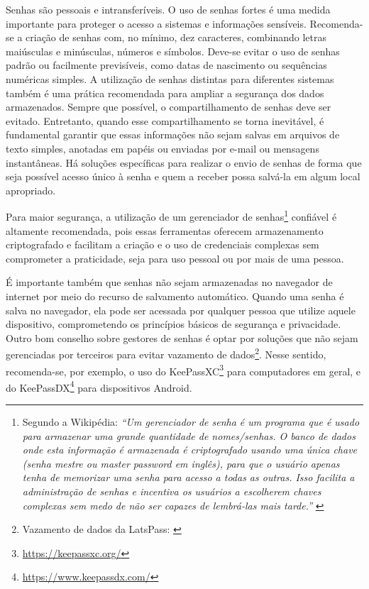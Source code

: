 Senhas são pessoais e intransferíveis. O uso de senhas fortes é uma medida importante para proteger o acesso a sistemas e informações sensíveis. Recomenda-se a criação de senhas com, no mínimo, dez caracteres, combinando letras maiúsculas e minúsculas, números e símbolos. Deve-se evitar o uso de senhas padrão ou facilmente previsíveis, como datas de nascimento ou sequências numéricas simples. A utilização de senhas distintas para diferentes sistemas também é uma prática recomendada para ampliar a segurança dos dados armazenados. Sempre que possível, o compartilhamento de senhas deve ser evitado. Entretanto, quando esse compartilhamento se torna inevitável, é fundamental garantir que essas informações não sejam salvas em arquivos de texto simples, anotadas em papéis ou enviadas por e-mail ou mensagens instantâneas. Há soluções específicas para realizar o envio de senhas de forma que seja possível acesso único à senha e quem a receber possa salvá-la em algum local apropriado.

Para maior segurança, a utilização de um gerenciador de senhas\footnote{Segundo a Wikipédia: \textit{``Um gerenciador de senha é um programa que é usado para armazenar uma grande quantidade de nomes/senhas. O banco de dados onde esta informação é armazenada é criptografado usando uma única chave (senha mestre ou \foreignlanguage{english}{master password} em inglês), para que o usuário apenas tenha de memorizar uma senha para acesso a todas as outras. Isso facilita a administração de senhas e incentiva os usuários a escolherem chaves complexas sem medo de não ser capazes de lembrá-las mais tarde.''} \cite{wikipediaGerenciadorSenha}} confiável é altamente recomendada, pois essas ferramentas oferecem armazenamento criptografado e facilitam a criação e o uso de credenciais complexas sem comprometer a praticidade, seja para uso pessoal ou por mais de uma pessoa.

É importante também que senhas não sejam armazenadas no navegador de internet por meio do recurso de salvamento automático. Quando uma senha é salva no navegador, ela pode ser acessada por qualquer pessoa que utilize aquele dispositivo, comprometendo os princípios básicos de segurança e privacidade. Outro bom conselho sobre gestores de senhas é optar por soluções que não sejam gerenciadas por terceiros para evitar vazamento de dados\footnote{Vazamento de dados da LatsPass: \cite{goodin_lastpass_2022} \cite{vinton_lastpass_2015}}. Nesse sentido, recomenda-se, por exemplo, o uso do KeePassXC\footnote{\url{https://keepassxc.org/}} para computadores em geral, e do KeePassDX\footnote{\url{https://www.keepassdx.com/}} para dispositivos Android.

